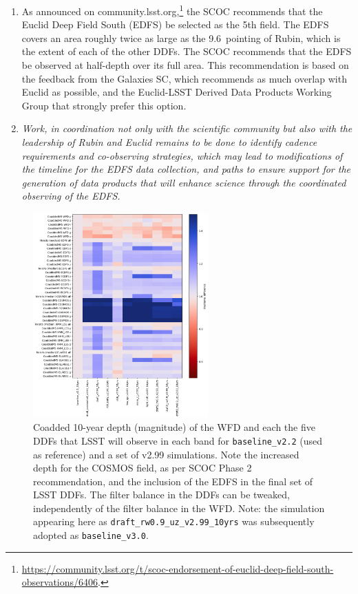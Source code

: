 \begin{enumerate}
\item As announced on community.lsst.org,\footnote{\url{https://community.lsst.org/t/scoc-endorsement-of-euclid-deep-field-south-observations/6406}.} the SCOC recommends that the Euclid Deep Field South (EDFS) be selected as the 5th field. The EDFS covers an area roughly twice as large as the 9.6\degsq\ pointing of Rubin, which is the extent of each of the other DDFs. The SCOC recommends that the EDFS be observed at half-depth over its full area.
This recommendation is based on the feedback from the Galaxies SC, which recommends as much overlap with Euclid as possible, and the Euclid-LSST Derived Data Products Working Group \citep{https://doi.org/10.5281/zenodo.7195671} that strongly prefer this option. 

\item
 \emph{Work, in coordination not only with the scientific community but also with the leadership of Rubin and Euclid remains to be done to identify cadence requirements and co-observing strategies, which may lead to modifications of the timeline for the EDFS data collection, and paths to ensure support for the generation of data products that will enhance science through the coordinated observing of the EDFS.}


\end{enumerate}

\begin{figure}
    \centering
    \includegraphics[width=0.6\textwidth]{figures/ddf.png}
    \caption{Coadded 10-year depth (magnitude) of the WFD and each the five DDFs that LSST will observe in each band for \texttt{baseline\_v2.2} (used as reference) and a set of v2.99 simulations. Note the increased depth for the COSMOS field, as per SCOC Phase 2 recommendation, and the inclusion of the EDFS in the final set of LSST DDFs. The filter balance in the DDFs can be tweaked, independently of the filter balance in the WFD. Note: the simulation appearing here as \texttt{draft\_rw0.9\_uz\_v2.99\_10yrs} was subsequently adopted as \texttt{baseline\_v3.0}.}
    \label{fig:my_label}
\end{figure}
